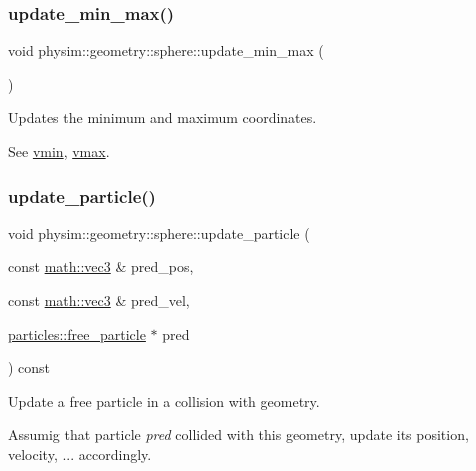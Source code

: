 \subsubsection{\texorpdfstring{update\+\_\+min\+\_\+max()}{update\_min\_max()}}
{\footnotesize\ttfamily void physim\+::geometry\+::sphere\+::update\+\_\+min\+\_\+max (\begin{DoxyParamCaption}{ }\end{DoxyParamCaption})\hspace{0.3cm}{\ttfamily [private]}}



Updates the minimum and maximum coordinates. 

See \hyperlink{classphysim_1_1geometry_1_1geometry_aa71bc00f1ee7985bea5a62c090e3e83f}{vmin}, \hyperlink{classphysim_1_1geometry_1_1geometry_add95a288aa59f7fb24f6d9d69f397645}{vmax}. \mbox{\label{classphysim_1_1geometry_1_1sphere_adfea98b3611deb594d2598984fd6f9bb}} 
\subsubsection{\texorpdfstring{update\+\_\+particle()}{update\_particle()}\hspace{0.1cm}{\footnotesize\ttfamily [1/2]}}
{\footnotesize\ttfamily void physim\+::geometry\+::sphere\+::update\+\_\+particle (\begin{DoxyParamCaption}\item[{const \hyperlink{structphysim_1_1math_1_1vec3}{math\+::vec3} \&}]{pred\+\_\+pos,  }\item[{const \hyperlink{structphysim_1_1math_1_1vec3}{math\+::vec3} \&}]{pred\+\_\+vel,  }\item[{\hyperlink{classphysim_1_1particles_1_1free__particle}{particles\+::free\+\_\+particle} $\ast$}]{pred }\end{DoxyParamCaption}) const\hspace{0.3cm}{\ttfamily [virtual]}}



Update a free particle in a collision with geometry. 

Assumig that particle {\itshape pred} collided with this geometry, update its position, velocity, ... accordingly.

